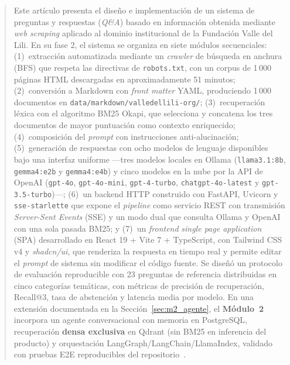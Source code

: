 \documentclass[conference]{IEEEtran}
\newcommand{\code}[1]{\texttt{\small #1}}
\begin{document}
\begin{abstract}
Este artículo presenta el diseño e implementación de un sistema de
preguntas y respuestas (\textit{Q\&A}) basado en información obtenida
mediante \textit{web scraping} aplicado al dominio institucional de la
Fundación Valle del Lili. En su fase 2, el sistema se organiza en siete
módulos secuenciales: (1)~extracción automatizada mediante un
\textit{crawler} de búsqueda en anchura (BFS) que respeta las directivas de
\code{robots.txt}, con un corpus de 1\,000 páginas HTML descargadas en
aproximadamente 51 minutos; (2)~conversión a Markdown con \textit{front
matter} YAML, produciendo 1\,000 documentos en
\code{data/markdown/valledellili-org/}; (3)~recuperación léxica con el
algoritmo BM25 Okapi, que selecciona y concatena los tres documentos de
mayor puntuación como contexto enriquecido; (4)~composición del
\textit{prompt} con instrucciones anti-alucinación; (5)~generación de
respuestas con ocho modelos de lenguaje disponibles bajo una interfaz
uniforme —tres modelos locales en Ollama (\code{llama3.1:8b},
\code{gemma4:e2b} y \code{gemma4:e4b}) y cinco modelos en la nube por la API
de OpenAI (\code{gpt-4o}, \code{gpt-4o-mini}, \code{gpt-4-turbo},
\code{chatgpt-4o-latest} y \code{gpt-3.5-turbo})—; (6)~un backend HTTP
construido con FastAPI, Uvicorn y \code{sse-starlette} que expone el
\textit{pipeline} como servicio REST con transmisión \textit{Server-Sent
Events} (SSE) y un modo dual que consulta Ollama y OpenAI con una sola pasada
BM25; y (7)~un \textit{frontend} \textit{single page application} (SPA)
desarrollado en React 19 + Vite 7 + TypeScript, con Tailwind CSS v4 y
\textit{shadcn/ui}, que renderiza la respuesta en tiempo real y permite
editar el \textit{prompt} de sistema sin modificar el código fuente. Se
diseñó un protocolo de evaluación reproducible con 23 preguntas de
referencia distribuidas en cinco categorías temáticas, con métricas de
precisión de recuperación, Recall@3, tasa de abstención y latencia media
por modelo. En una extensión documentada en la Sección~\ref{sec:m2_agente},
el \textbf{Módulo~2} incorpora un agente conversacional con memoria en
PostgreSQL, recuperación \textbf{densa exclusiva} en Qdrant (sin BM25 en
inferencia del producto) y orquestación LangGraph/LangChain/LlamaIndex,
validado con pruebas E2E reproducibles del repositorio~\cite{e2em2tests,
doc003m2,decision3m2}.
\end{abstract}
\end{document}
